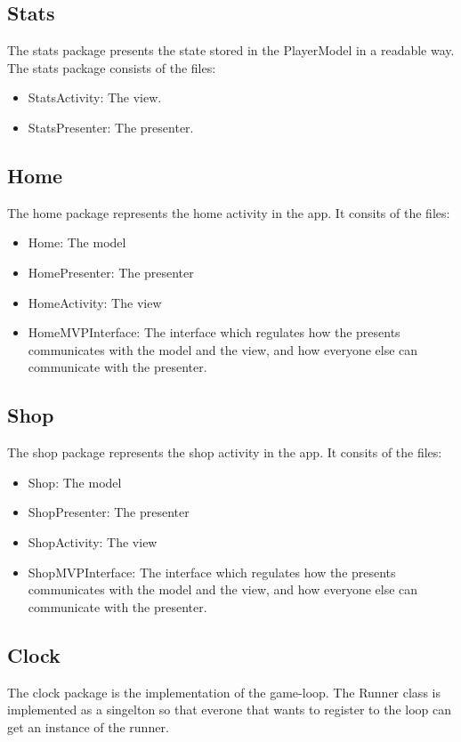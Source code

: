 \documentclass{article}
\begin{document}
\subsection{Stats}
The stats package presents the state stored in the PlayerModel in a readable way.\\
The stats package consists of the files:
\begin{itemize}
    \item StatsActivity: The view.
    \item StatsPresenter: The presenter.
\end{itemize}

\subsection{Home}
The home package represents the home activity in the app. It consits of the files:
\begin{itemize}
    \item Home: The model
    \item HomePresenter: The presenter
    \item HomeActivity: The view
    \item HomeMVPInterface: The interface which regulates how the presents communicates with the model and the view, and how everyone else can communicate with the presenter.
\end{itemize}

\subsection{Shop}
The shop package represents the shop activity in the app. It consits of the files:
\begin{itemize}
    \item Shop: The model
    \item ShopPresenter: The presenter
    \item ShopActivity: The view
    \item ShopMVPInterface: The interface which regulates how the presents communicates with the model and the view, and how everyone else can communicate with the presenter.
\end{itemize}

\subsection{Clock}
The clock package is the implementation of the game-loop. The Runner class is implemented as a singelton so that everone that wants to register to the loop can get an instance of the runner. 
\end{document}
